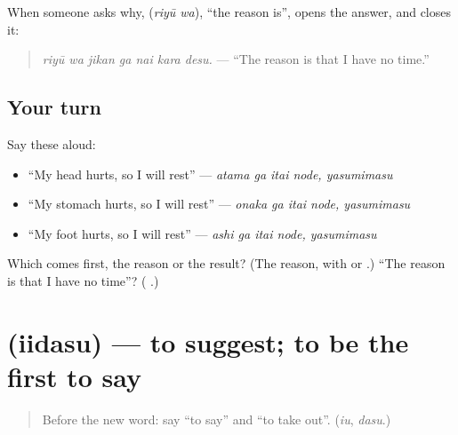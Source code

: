 When someone asks why, \textbf{} (\emph{riyū wa}), \textquotedblleft{}the reason is\textquotedblright{}, opens the answer, and \textbf{} closes it:

\begin{quote}
\textbf{  }
\end{quote}

\begin{quote}
\emph{riyū wa jikan ga nai kara desu.} — \textquotedblleft{}The reason is that I have no time.\textquotedblright{}
\end{quote}

\subsection*{Your turn}
Say these aloud:

\begin{itemize}
\raggedright
  \item \textquotedblleft{}My head hurts, so I will rest\textquotedblright{} — \emph{atama ga itai node, yasumimasu}
  \item \textquotedblleft{}My stomach hurts, so I will rest\textquotedblright{} — \emph{onaka ga itai node, yasumimasu}
  \item \textquotedblleft{}My foot hurts, so I will rest\textquotedblright{} — \emph{ashi ga itai node, yasumimasu}
\end{itemize}

\begin{tcolorbox}[breakable,colback=teal!4,colframe=teal!35!black,title={Before you move on}]
Which comes first, the reason or the result? (The reason, with \textbf{} or \textbf{}.) \textquotedblleft{}The reason is that I have no time\textquotedblright{}? (\textbf{  }.)
\end{tcolorbox}
\section[\texorpdfstring{\ja{言}\ja{い}\ja{出}\ja{す} (iidasu)}{言い出す (iidasu)}]{ (iidasu) — to suggest; to be the first to say}

\label{lesson:JA-C254-iidasu}



\begin{quote}
Before the new word: say \textquotedblleft{}to say\textquotedblright{} and \textquotedblleft{}to take out\textquotedblright{}. (\emph{iu}, \emph{dasu}.)
\end{quote}

